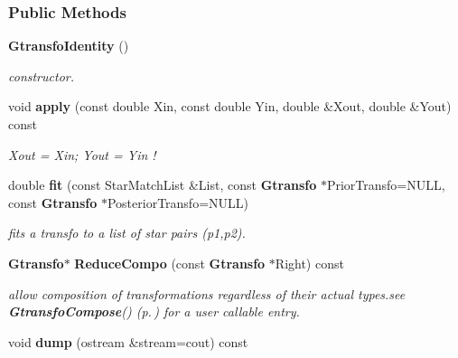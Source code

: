 \subsubsection*{Public Methods}
\begin{CompactItemize}
\item 
{}
{\bf Gtransfo\-Identity} ()\label{class_gtransfoidentity_a0}

\begin{CompactList}\small\item\em constructor.\item\end{CompactList}\item 
{}
void {\bf apply} (const double Xin, const double Yin, double \&Xout, double \&Yout) const\label{class_gtransfoidentity_a1}

\begin{CompactList}\small\item\em Xout = Xin; Yout = Yin !\item\end{CompactList}\item 
double {\bf fit} (const Star\-Match\-List \&List, const {\bf Gtransfo} $\ast$Prior\-Transfo=NULL, const {\bf Gtransfo} $\ast$Posterior\-Transfo=NULL)
\begin{CompactList}\small\item\em fits a transfo to a list of star pairs (p1,p2).\item\end{CompactList}\item 
{}
{\bf Gtransfo}$\ast$ {\bf Reduce\-Compo} (const {\bf Gtransfo} $\ast$Right) const\label{class_gtransfoidentity_a3}

\begin{CompactList}\small\item\em allow composition of transformations regardless of their actual types.see {\bf Gtransfo\-Compose}() {\rm (p.\,\pageref{gtransfo_h_a1})} for a user callable entry.\item\end{CompactList}\item 
{}
void {\bf dump} (ostream \&stream=cout) const\label{class_gtransfoidentity_a4}


\end{CompactItemize}
